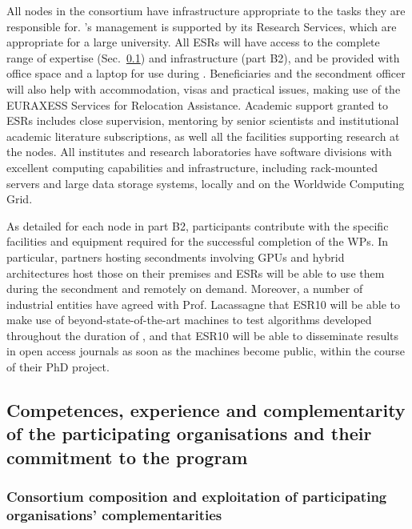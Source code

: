 %
All nodes in the consortium have infrastructure appropriate to the tasks
they are responsible for. \lundentity's management is supported by its Research Services, 
which are appropriate for a large university. 
All ESRs will have access to the complete range of \acronym
expertise (Sec.~\ref{ss:competence_44}) and infrastructure (part B2),
and be provided with office space and a laptop for use during \acronym. 
Beneficiaries and the secondment officer will also help with accommodation,
visas and practical issues, making use of the EURAXESS Services for Relocation Assistance. 
Academic support granted to ESRs includes close supervision, mentoring by senior scientists and 
institutional academic literature subscriptions, as well all the facilities supporting research at the nodes. 
All institutes and research laboratories have software divisions with excellent computing
capabilities and infrastructure, including rack-mounted
servers and large data storage systems, locally and on the Worldwide Computing Grid. 

As detailed for each node in part B2, \acronym participants
contribute with the specific facilities and equipment required for the successful completion of the WPs.
In particular, partners hosting secondments involving GPUs and hybrid architectures host those on their premises
and ESRs will be able to use them during the secondment and remotely on demand. 
Moreover, a number of industrial entities have agreed with Prof. Lacassagne that ESR10
will be able to make use of beyond-state-of-the-art machines to test algorithms developed
throughout the duration of \acronym, and that ESR10 will
be able to disseminate results in open access journals as soon as
the machines become public, within the course of their PhD project. 

%
\subsection{Competences, experience and complementarity of the participating organisations and their commitment to the program}
\label{ss:competence_44}

\subsubsection{Consortium composition and exploitation of participating organisations' complementarities}
\label{sub:composition}

